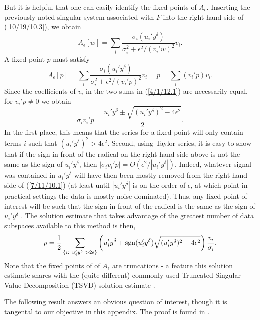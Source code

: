 \documentclass{amsart}
\numberwithin{equation}{section}
\theoremstyle{definition}
\numberwithin{theorem}{section}
\begin{document}
 
But it is helpful that one can easily identify the fixed points of $A_\epsilon$. Inserting the previously noted
singular system associated with $F$ into the right-hand-side of (\ref{10/19/10.3}),  we obtain \begin{equation}\label{3/31/12.3} A_\epsilon[w] = \sum_i \frac{\sigma_i (u_i'y^\delta)}{\sigma_i^2 + \epsilon^2/(v_i'w)^2}v_i .\end{equation} A fixed point $p$ must satisfy  \begin{equation}\label{4/1/12.1} A_\epsilon[p] = \sum_i  \frac{\sigma_i (u_i'y^\delta)}{\sigma_i^2 + \epsilon^2/(v_i'p)^2}v_i = p = \sum_i  (v_i' p)v_i.\end{equation}  Since the coefficients of $v_i$ in the two sums in (\ref{4/1/12.1}) are necessarily equal, for $v_i'p\ne 0$ we obtain \begin{equation}\label{7/11/10.1} \sigma_iv_i'p = \frac{u_i' y^\delta \pm \sqrt{(u_i'y^\delta)^2 -4\epsilon^2}}{2}.\end{equation}  In the first place, this means that the series for a fixed point will only contain terms $i$ such that $(u_i'y^\delta)^2 >4\epsilon^2$.  Second, using Taylor series, it is easy to show that if the sign in front of the radical on the right-hand-side above is not the same as the sign of $u_i'y^\delta$, then $|\sigma_i v_i'p| =  O(\epsilon^2/|u_i'y^\delta|)$.  Indeed, whatever signal
 was contained in $u_i'y^\delta$ will have then been mostly 
 removed from the right-hand-side of (\ref{7/11/10.1}) (at least until $|u_i'y^\delta|$ is on the order of $\epsilon$, at which point in practical settings the data is mostly noise-dominated).   Thus, any fixed point of interest will be such that the sign in front of the radical is the same as the sign of $u_i'y^\delta$ .   The solution estimate that takes advantage of the greatest number of data subspaces available to this method is then,
\begin{equation}\label{7/19/10.1} p = \frac{1}{2}\sum_{\{i:\,|u_i'y^\delta|>2\epsilon\}} \left(u_i' y^\delta + {\rm sgn}(u_i' y^\delta) \sqrt{(u_i'y^\delta)^2 -4\epsilon^2}\right)\frac{v_i}{\sigma_i}.\end{equation}      
Note that the fixed points of of $A_\epsilon$ are truncations - a feature this solution estimate shares with the (quite different)  commonly used Truncated Singular Value Decomposition (TSVD) solution estimate \cite{vogel:2002}.  

The following result answers an obvious question of interest, though it is tangental to our objective in this appendix.  The proof is found in \cite{fgreensite:2022d}.
\end{document}
